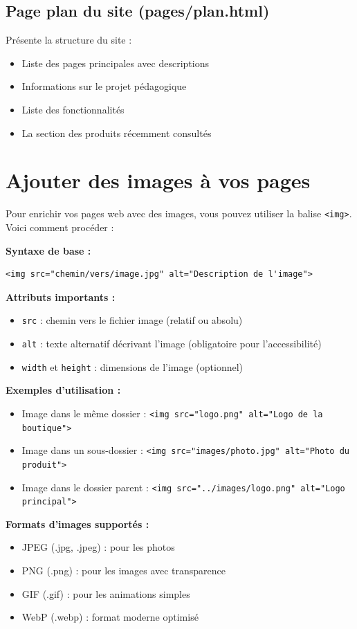 \documentclass[12pt,a4paper]{article}
\begin{document}
\subsection{Page plan du site (pages/plan.html)}
Présente la structure du site :
\begin{itemize}
\item Liste des pages principales avec descriptions
\item Informations sur le projet pédagogique
\item Liste des fonctionnalités
\item La section des produits récemment consultés
\end{itemize}


\section{Ajouter des images à vos pages}

Pour enrichir vos pages web avec des images, vous pouvez utiliser la balise \texttt{<img>}. Voici comment procéder :

\textbf{Syntaxe de base :}
\begin{lstlisting}
<img src="chemin/vers/image.jpg" alt="Description de l'image">
\end{lstlisting}

\textbf{Attributs importants :}
\begin{itemize}
\item \texttt{src} : chemin vers le fichier image (relatif ou absolu)
\item \texttt{alt} : texte alternatif décrivant l'image (obligatoire pour l'accessibilité)
\item \texttt{width} et \texttt{height} : dimensions de l'image (optionnel)
\end{itemize}

\textbf{Exemples d'utilisation :}
\begin{itemize}
\item Image dans le même dossier : \texttt{<img src="logo.png" alt="Logo de la boutique">}
\item Image dans un sous-dossier : \texttt{<img src="images/photo.jpg" alt="Photo du produit">}
\item Image dans le dossier parent : \texttt{<img src="../images/logo.png" alt="Logo principal">}
\end{itemize}

\textbf{Formats d'images supportés :}
\begin{itemize}
\item JPEG (.jpg, .jpeg) : pour les photos
\item PNG (.png) : pour les images avec transparence
\item GIF (.gif) : pour les animations simples
\item WebP (.webp) : format moderne optimisé
\end{itemize}
\end{document}
